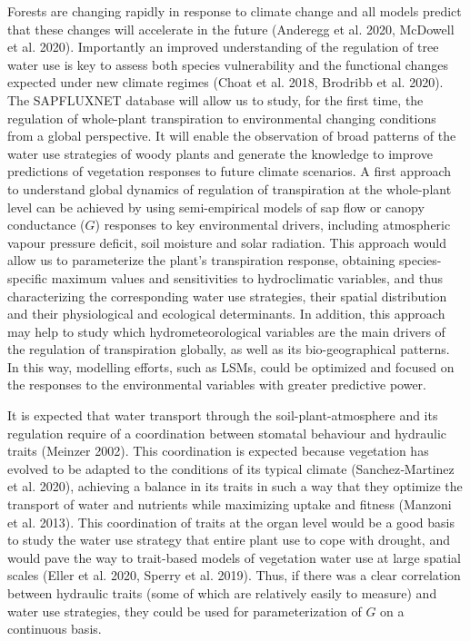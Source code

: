 \documentclass[11pt,twoside]{reedthesis}
\begin{document}
Forests are changing rapidly in response to climate change and all
models predict that these changes will accelerate in the future
(Anderegg et al. 2020, McDowell et al. 2020). Importantly an improved
understanding of the regulation of tree water use is key to assess both
species vulnerability and the functional changes expected under new
climate regimes (Choat et al. 2018, Brodribb et al. 2020). The
SAPFLUXNET database will allow us to study, for the first time, the
regulation of whole-plant transpiration to environmental changing
conditions from a global perspective. It will enable the observation of
broad patterns of the water use strategies of woody plants and generate
the knowledge to improve predictions of vegetation responses to future
climate scenarios. A first approach to understand global dynamics of
regulation of transpiration at the whole-plant level can be achieved by
using semi-empirical models of sap flow or canopy conductance (\(G\))
responses to key environmental drivers, including atmospheric vapour
pressure deficit, soil moisture and solar radiation. This approach would
allow us to parameterize the plant's transpiration response, obtaining
species-specific maximum values and sensitivities to hydroclimatic
variables, and thus characterizing the corresponding water use
strategies, their spatial distribution and their physiological and
ecological determinants. In addition, this approach may help to study
which hydrometeorological variables are the main drivers of the
regulation of transpiration globally, as well as its bio-geographical
patterns. In this way, modelling efforts, such as LSMs, could be
optimized and focused on the responses to the environmental variables
with greater predictive power.\par

It is expected that water transport through the soil-plant-atmosphere
and its regulation require of a coordination between stomatal behaviour
and hydraulic traits (Meinzer 2002). This coordination is expected
because vegetation has evolved to be adapted to the conditions of its
typical climate (Sanchez‐Martinez et al. 2020), achieving a balance in
its traits in such a way that they optimize the transport of water and
nutrients while maximizing  uptake and fitness (Manzoni et
al. 2013). This coordination of traits at the organ level would be a
good basis to study the water use strategy that entire plant use to cope
with drought, and would pave the way to trait-based models of vegetation
water use at large spatial scales (Eller et al. 2020, Sperry et al.
2019). Thus, if there was a clear correlation between hydraulic traits
(some of which are relatively easily to measure) and water use
strategies, they could be used for parameterization of \(G\) on a
continuous basis.\par
\end{document}
